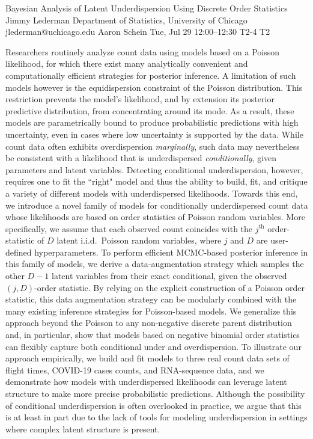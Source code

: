 \begin{talk}
  {Bayesian Analysis of Latent Underdispersion Using Discrete Order Statistics}%
  {Jimmy Lederman}%
  {Department of Statistics, University of Chicago}%
  {jlederman@uchicago.edu}%
  {Aaron Schein}%
  {}%
  {Tue, Jul 29 12:00--12:30}%
  {T2-4}%
  {T2}%
  
    


Researchers routinely analyze count data using models based on a Poisson likelihood, for which there exist many analytically convenient and computationally efficient strategies for posterior inference. A limitation of such models however is the equidispersion constraint of the Poisson distribution. This restriction prevents the model's likelihood, and by extension its posterior predictive distribution, from concentrating around its mode. As a result, these models are parametrically bound to produce probabilistic predictions with high uncertainty, even in cases where low uncertainty is supported by the data. While count data often exhibits overdispersion \textit{marginally}, such data may nevertheless be consistent with a likelihood that is underdispersed \textit{conditionally}, given parameters and latent variables. Detecting conditional underdispersion, however, requires one to fit the ``right" model and thus the ability to build, fit, and critique a variety of different models with underdispersed likelihoods. Towards this end, we introduce a novel family of models for conditionally underdispersed count data whose likelihoods are based on order statistics of Poisson random variables. More specifically, we assume that each observed count coincides with the $j^{\textrm{th}}$ order-statistic of $D$ latent i.i.d.~Poisson random variables, where $j$ and $D$ are user-defined hyperparameters. To perform efficient MCMC-based posterior inference in this family of models, we derive a data-augmentation strategy which samples the other $D{-}1$ latent variables from their exact conditional, given the observed $(j,D)$-order statistic. By relying on the explicit construction of a Poisson order statistic, this data augmentation strategy can be modularly combined with the many existing inference strategies for Poisson-based models. We generalize this approach beyond the Poisson to any non-negative discrete parent distribution and, in particular, show that models based on negative binomial order statistics can flexibly capture both conditional under and overdispersion.  To illustrate our approach empirically, we build and fit models to three real count data sets of flight times, COVID-19 cases counts, and RNA-sequence data, and we demonstrate how models with underdispersed likelihoods can leverage latent structure to make more precise probabilistic predictions. Although the possibility of conditional underdispersion is often overlooked in practice, we argue that this is at least in part due to the lack of tools for modeling underdispersion in settings where complex latent structure is present.


\end{talk}
